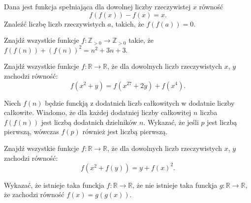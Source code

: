 \begin{problem}{1}
	Dana jest funkcja spełniająca dla dowolnej liczby rzeczywistej $x$ równość
	\[
		f(f(x)) - f(x) = x.
	\]
	Znaleźć liczbę liczb rzeczywistych $a$, takich, że $f(f(a)) = 0$.
\end{problem}

\begin{problem}{2}
	Znajdź wszystkie funkcje  $ f: \mathbb{Z}_{>0} \to \mathbb{Z}_{>0}$ takie, że  $f(f(n)) + (f(n))^2 = n^2 + 3n + 3$.
\end{problem}


\begin{problem}{3}
	Znajdź wszystkie funkcje $f:\mathbb{R}\longrightarrow\mathbb{R}$, że dla dowolnych liczb rzeczywistych $x$, $y$ zachodzi równość:
	\[
		f(x^2 + y) = f(x^{27} + 2y) + f(x^4).
	\]
\end{problem}

\begin{problem}{4}
	Niech $f(n)$ będzie funckją z dodatnich liczb całkowitych w dodatnie liczby całkowite. Wiadomo, że dla każdej dodatniej liczby całkowitej $n$ liczba  $f(f(n))$ jest liczbą dodatnich dzielników $n$. Wykazać, że jeśli $p$ jest liczbą pierwszą, wówczas $f(p)$ również jest liczbą pierwszą.
\end{problem}

\begin{problem}{5}
	Znajdź wszystkie funkcje $f:\mathbb{R}\longrightarrow\mathbb{R}$, że dla dowolnych liczb rzeczywistych $x$, $y$ zachodzi równość:
	\[
		f(x^2+f(y))=y+f(x)^2.
	\]
\end{problem}

\begin{problem}{6}
	Wykazać, że istnieje taka funckja $f:\mathbb{R}\longrightarrow\mathbb{R}$, że nie istnieje taka funckja $g:\mathbb{R}\longrightarrow\mathbb{R}$, że zachodzi równość $f(x) = g(g(x))$.
\end{problem}


